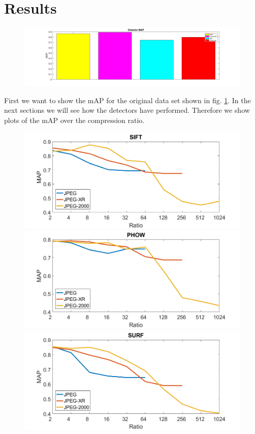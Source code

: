 \documentclass[10pt,a4paper,twocolumn]{article}
\begin{document}
\section{Results}
\begin{figure}[h]
	\includegraphics[width=1.2\textwidth]{img/refmap.png}
	\label{fig:map}
\end{figure}
First we want to show the mAP for the original data set shown in fig. \ref{fig:map}.
In the next sections we will see how the detectors have performed. Therefore we show plots of the mAP over the compression ratio.
\begin{figure}[h]
	\includegraphics[width = \textwidth]{img/sift_map.png}
	\includegraphics[width = \textwidth]{img/phow_map.png}
	\includegraphics[width = \textwidth]{img/surf_map.png}
\end{figure}
\end{document}
